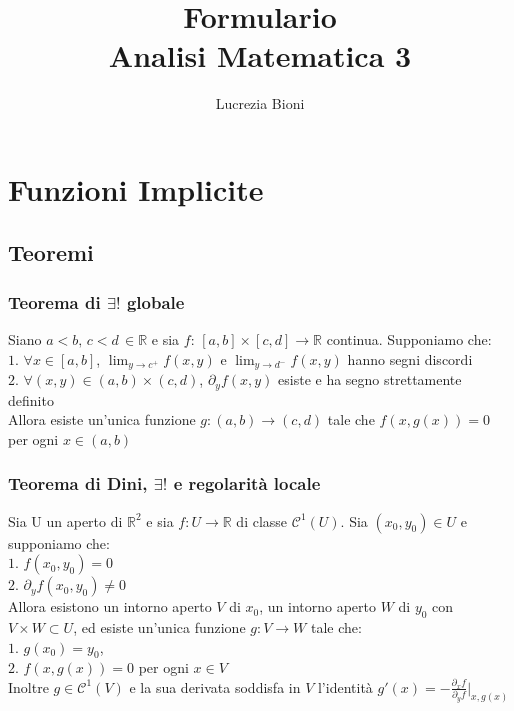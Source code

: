 \documentclass{article} %
\title{%
    \Large Formulario \\
    \large Analisi Matematica 3}
\author{ \small Lucrezia Bioni} %
\date{} %
\begin{document}
    \maketitle

    \section{Funzioni Implicite}
    \subsection{Teoremi}
    \subsubsection*{Teorema di $\exists !$ globale}
    Siano $a<b, \, c<d \, \in \mathbb{R}$ e sia $f: \, [a,b] \times [c,d] \to \mathbb{R}$ continua. Supponiamo che: \\
    $1.$ $\forall x \in [a,b]$, $\lim_{y \to c^+} f(x,y)$ e $\lim_{y \to d^-} f(x,y)$ hanno segni discordi \\
    $2.$ $\forall (x,y) \in (a,b) \times (c,d)$, $\partial_yf(x,y)$ esiste e ha segno strettamente definito \\
    Allora esiste un'unica funzione $g:(a,b) \to (c,d)$ tale che $f(x , g(x))=0$ per ogni $x \in (a,b)$ 
    \subsubsection*{Teorema di Dini, $\exists !$ e regolarità locale}
    Sia U un aperto di $\mathbb{R}^2$ e sia $f:U \to \mathbb{R}$ di classe $\mathcal{C}^1\left(U\right)$. Sia $(x_0,y_0)\in U$ e supponiamo che: \\
    $1.$ $f(x_0,y_0)=0$ \\
    $2.$ $\partial_y f(x_0,y_0) \neq 0$ \\
    Allora esistono un intorno aperto $V$ di $x_0$, un intorno aperto $W$ di $y_0$ con $V \times W \subset U$, ed esiste un'unica funzione $g: V \to W$ tale che: \\
    $1.$ $g(x_0)=y_0$, \\
    $2.$ $f(x,g(x))=0$ per ogni $x \in V$ \\
    Inoltre $g \in \mathcal{C}^1(V)$ e la sua derivata soddisfa in $V$ l'identità $g'(x) = - \frac{\partial_x f}{\partial_y f}|_{x,g(x)}$ 
    
\end{document}
